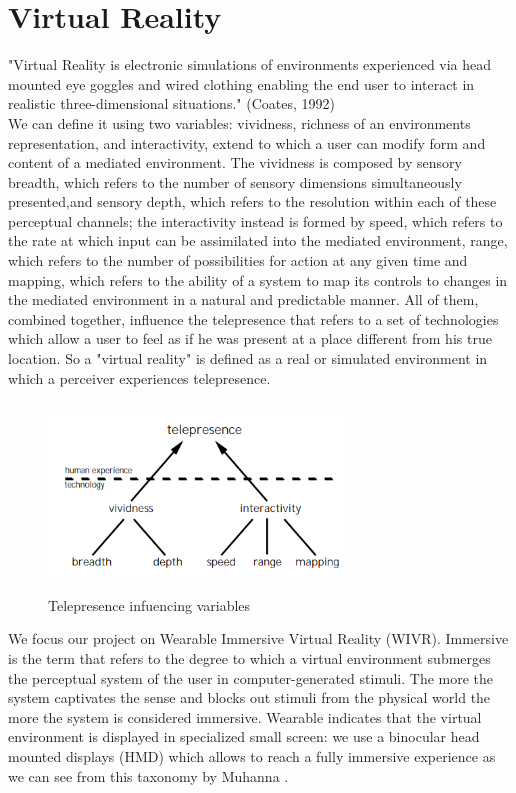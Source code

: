 \section{Virtual Reality}
"Virtual Reality is electronic simulations of environments experienced via head mounted eye goggles and wired clothing enabling the end user to interact in realistic three-dimensional situations." (Coates, 1992)\\
We can define it using two variables: vividness, richness of an environments representation, and interactivity, extend to which a user can modify form and content of a mediated environment. The vividness is composed by sensory breadth, which refers to the number of sensory dimensions simultaneously presented,and sensory depth, which refers to the resolution within each of these perceptual channels; the interactivity instead is formed by speed, which refers to the rate at which input can be assimilated into the mediated environment, range, which refers to the number of possibilities for action at any given time and mapping, which refers to the ability of a system to map its controls to changes in the mediated environment in a natural and predictable manner.\cite{StefanSeipel} All of them, combined together, influence the telepresence that refers to a set of technologies which allow a user to feel as if he was present at a place different from his true location. So a "virtual reality" is defined as a real or simulated environment in which a perceiver experiences telepresence.\cite{JonathanSteuer}\\
\begin{figure}[H]
\centering
\includegraphics[width=8cm, height=5cm]{immagini/telepresence.png}
\caption{Telepresence infuencing variables}\label{fig:telepresence}
\end{figure}
We focus our project on Wearable Immersive Virtual Reality (WIVR). Immersive is the term that refers to the degree to which a virtual environment submerges the perceptual system of the user in computer-generated stimuli. The more the system captivates the sense and blocks out stimuli from the physical world the more the system is considered immersive.\cite{BioccaDelaney} Wearable indicates that the virtual environment is displayed in specialized small screen: we use a binocular head mounted displays (HMD) which allows to reach a fully immersive experience as we can see from this taxonomy by Muhanna \cite{Muhanna}.
